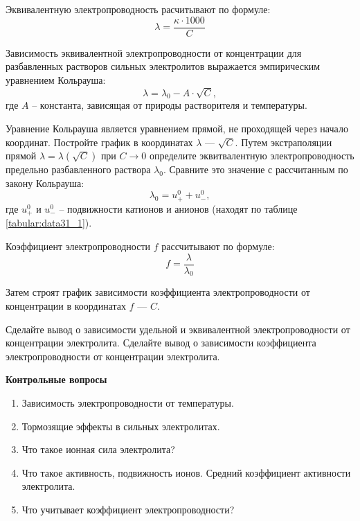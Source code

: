 Эквивалентную электропроводность расчитывают по формуле:
$$\lambda=\frac{\kappa\cdot 1000}{C}$$

Зависимость эквивалентной электропроводности от  концентрации для разбавленных растворов сильных электролитов выражается эмпирическим уравнением Кольрауша:
$$\lambda = \lambda_{0}-A\cdot\sqrt{C},$$
где $A$ -- константа, зависящая от природы растворителя и температуры.

Уравнение Кольрауша является уравнением прямой, не проходящей через начало координат. Постройте график в координатах $\lambda$ --- $\sqrt{C}$. Путем экстраполяции прямой $\lambda=\lambda (\sqrt{C})$ при $C \rightarrow 0$ определите эквитвалентную электропроводность предельно разбавленного раствора $\lambda_{0}$. Сравните это значение с рассчитанным по закону Кольрауша:
$$\lambda_{0}=u_{+}^{0}+u_{-}^{0},$$
где $u_{+}^{0}$ и $u_{-}^{0}$ -- подвижности катионов и анионов (находят по таблице \ref{tabular:data31_1}).

Коэффициент электропроводности $f$ рассчитывают по формуле:
$$f=\frac{\lambda}{\lambda_{0}}$$

Затем строят график зависимости коэффициента электропроводности от концентрации в координатах $f$ --- $C$.

Сделайте вывод о зависимости удельной  и эквивалентной электропроводности от концентрации электролита.  Сделайте вывод о зависимости коэффициента электропроводности от концентрации электролита.

\textbf{Контрольные вопросы}
\begin{enumerate}
\item Зависимость электропроводности от температуры.
\item Тормозящие эффекты в сильных электролитах. 
\item Что такое ионная сила электролита?
\item Что такое активность, подвижность ионов. Средний коэффициент активности электролита.
\item Что учитывает коэффициент электропроводности?
\end{enumerate}

